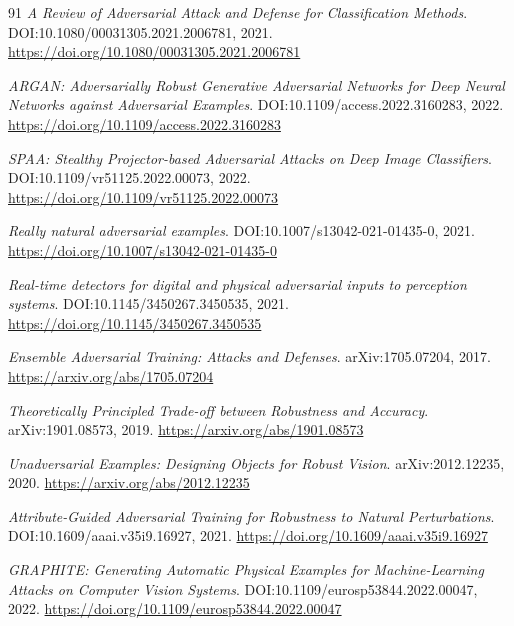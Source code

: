 \documentclass[11pt,a4paper]{article}
\begin{document}
\begin{thebibliography}{91}
\newblock \emph{A Review of Adversarial Attack and Defense for Classification Methods}.
\newblock DOI:10.1080/00031305.2021.2006781, 2021.
\newblock \url{https://doi.org/10.1080/00031305.2021.2006781}

\newblock \emph{ARGAN: Adversarially Robust Generative Adversarial Networks for Deep Neural Networks against Adversarial Examples}.
\newblock DOI:10.1109/access.2022.3160283, 2022.
\newblock \url{https://doi.org/10.1109/access.2022.3160283}

\newblock \emph{SPAA: Stealthy Projector-based Adversarial Attacks on Deep Image Classifiers}.
\newblock DOI:10.1109/vr51125.2022.00073, 2022.
\newblock \url{https://doi.org/10.1109/vr51125.2022.00073}

\newblock \emph{Really natural adversarial examples}.
\newblock DOI:10.1007/s13042-021-01435-0, 2021.
\newblock \url{https://doi.org/10.1007/s13042-021-01435-0}

\newblock \emph{Real-time detectors for digital and physical adversarial inputs to perception systems}.
\newblock DOI:10.1145/3450267.3450535, 2021.
\newblock \url{https://doi.org/10.1145/3450267.3450535}

\newblock \emph{Ensemble Adversarial Training: Attacks and Defenses}.
\newblock arXiv:1705.07204, 2017.
\newblock \url{https://arxiv.org/abs/1705.07204}

\newblock \emph{Theoretically Principled Trade-off between Robustness and Accuracy}.
\newblock arXiv:1901.08573, 2019.
\newblock \url{https://arxiv.org/abs/1901.08573}

\newblock \emph{Unadversarial Examples: Designing Objects for Robust Vision}.
\newblock arXiv:2012.12235, 2020.
\newblock \url{https://arxiv.org/abs/2012.12235}

\newblock \emph{Attribute-Guided Adversarial Training for Robustness to Natural Perturbations}.
\newblock DOI:10.1609/aaai.v35i9.16927, 2021.
\newblock \url{https://doi.org/10.1609/aaai.v35i9.16927}

\newblock \emph{GRAPHITE: Generating Automatic Physical Examples for Machine-Learning Attacks on Computer Vision Systems}.
\newblock DOI:10.1109/eurosp53844.2022.00047, 2022.
\newblock \url{https://doi.org/10.1109/eurosp53844.2022.00047}


\end{thebibliography}
\end{document}
